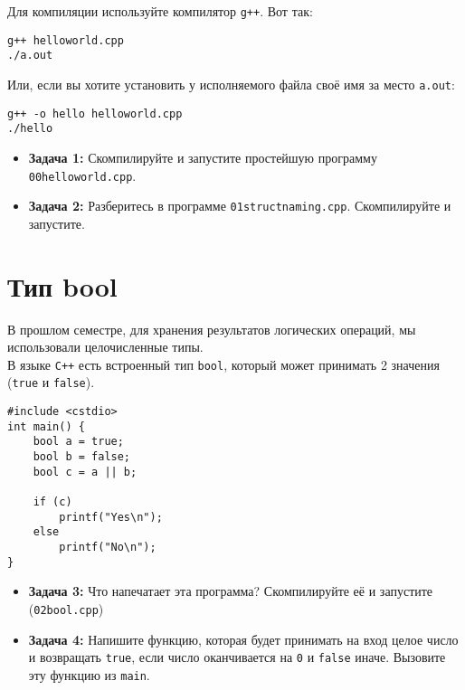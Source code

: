 \documentclass{article}
\begin{document}
Для компиляции используйте компилятор \texttt{g++}. Вот так:
\begin{verbatim}
g++ helloworld.cpp
./a.out
\end{verbatim}
Или, если вы хотите установить у исполняемого файла своё имя за место \texttt{a.out}:
\begin{verbatim}
g++ -o hello helloworld.cpp
./hello
\end{verbatim}

\begin{itemize}
\item \textbf{Задача 1:} Скомпилируйте и запустите простейшую программу \texttt{00helloworld.cpp}.
\item \textbf{Задача 2:} Разберитесь в программе \texttt{01structnaming.cpp}. Скомпилируйте и запустите.
\end{itemize}

\section*{Тип bool}
В прошлом семестре, для хранения результатов логических операций, мы использовали целочисленные типы.\\
В языке \texttt{C++} есть встроенный тип \texttt{bool}, который может принимать 2 значения (\texttt{true} и \texttt{false}).
\begin{lstlisting}
#include <cstdio>
int main() {
	bool a = true;
	bool b = false;
	bool c = a || b;

	if (c)
		printf("Yes\n");
	else
		printf("No\n");
}
\end{lstlisting}
\begin{itemize}
\item \textbf{Задача 3:} Что напечатает эта программа? Скомпилируйте её и запустите (\texttt{02bool.cpp})
\item \textbf{Задача 4:} Напишите функцию, которая будет принимать на вход целое число и возвращать \texttt{true}, если число оканчивается на \texttt{0} и \texttt{false} иначе. Вызовите эту функцию из \texttt{main}.
\end{itemize}

\newpage
\end{document}
